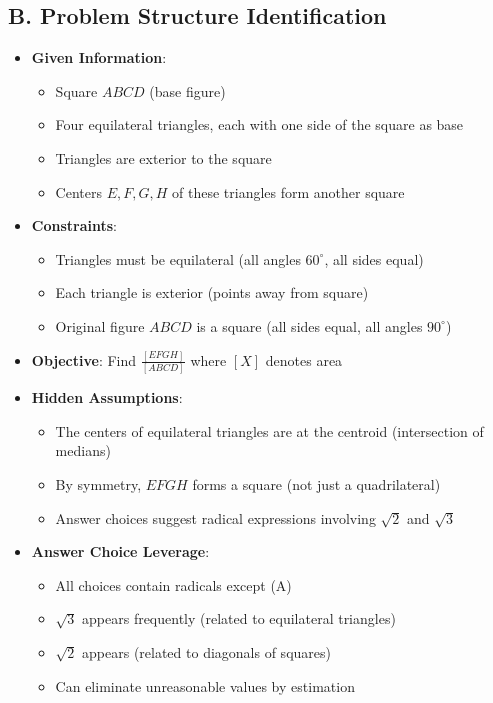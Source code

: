 \documentclass[]{article}
\begin{document}
\begin{problemconfigbox}
\subsection*{B. Problem Structure Identification}
\begin{itemize}[leftmargin=*]
    \item \textbf{Given Information}: 
    \begin{itemize}
        \item Square $ABCD$ (base figure)
        \item Four equilateral triangles, each with one side of the square as base
        \item Triangles are exterior to the square
        \item Centers $E, F, G, H$ of these triangles form another square
    \end{itemize}
    \item \textbf{Constraints}: 
    \begin{itemize}
        \item Triangles must be equilateral (all angles $60^\circ$, all sides equal)
        \item Each triangle is exterior (points away from square)
        \item Original figure $ABCD$ is a square (all sides equal, all angles $90^\circ$)
    \end{itemize}
    \item \textbf{Objective}: Find $\frac{[EFGH]}{[ABCD]}$ where $[X]$ denotes area
    \item \textbf{Hidden Assumptions}: 
    \begin{itemize}
        \item The centers of equilateral triangles are at the centroid (intersection of medians)
        \item By symmetry, $EFGH$ forms a square (not just a quadrilateral)
        \item Answer choices suggest radical expressions involving $\sqrt{2}$ and $\sqrt{3}$
    \end{itemize}
    \item \textbf{Answer Choice Leverage}: 
    \begin{itemize}
        \item All choices contain radicals except (A)
        \item $\sqrt{3}$ appears frequently (related to equilateral triangles)
        \item $\sqrt{2}$ appears (related to diagonals of squares)
        \item Can eliminate unreasonable values by estimation
    \end{itemize}
\end{itemize}


\end{problemconfigbox}
\end{document}

